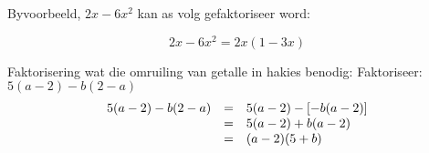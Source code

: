 Byvoorbeeld, $2x-6{x}^{2}$ kan as volg gefaktoriseer word:\par 

\begin{equation*}
2x-6{x}^{2}=2x(1-3x)
\end{equation*}


% 


\begin{wex}{ Faktorisering wat die omruiling van getalle in hakies benodig: }{Faktoriseer: $5(a-2)-b(2-a)$ }{
\begin{equation*}
\begin{array}{ccl}
\hfill 5(a-2)-b(2-a)& =& \hfill 5(a-2)-[-b(a-2)]  \\
&= & 5(a-2)+b(a-2)\\ 
& =& (a-2)(5+b) \hfill
\end{array}
\end{equation*}
}
\end{wex}

% 

